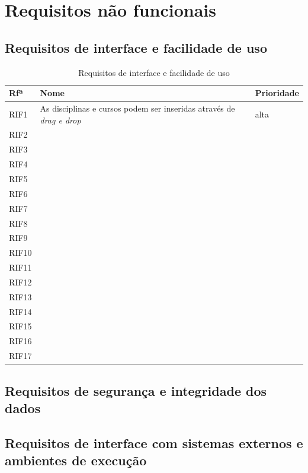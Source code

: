 \documentclass[11pt, twoside]{report}
\begin{document}
	
	\section{Requisitos não funcionais}
	\subsection{Requisitos de interface e facilidade de uso}
		\begin{table}[H]
		\centering
		\caption{Requisitos de interface e facilidade de uso}	
		\vspace{0.5cm}
		\begin{tabular}{|l|l|l|}
			\hline
			Rfª & Nome & Prioridade\\
			\hline
			RIF1 & As disciplinas e cursos podem ser inseridas através de \textit{drag e drop} &alta\\
			\hline
			RIF2 & &\\
			\hline
			RIF3 &&\\
			\hline
			RIF4 &&\\
			\hline
			RIF5 &&\\
			\hline
			RIF6&&\\
			\hline
			RIF7& & \\
			\hline
			RIF8& & \\
			\hline
			RIF9& &\\
			\hline
			RIF10&&\\
			\hline
			RIF11&&\\
			\hline
			RIF12& &\\
			\hline
			RIF13&&\\
			\hline
			RIF14&&\\
			\hline
			RIF15&&\\
			\hline
			RIF16&&\\
			\hline
			RIF17&&\\
			\hline
		\end{tabular}
		\label{requisitosdeinterface}
	\end{table}
	\subsection{Requisitos de segurança e integridade dos dados}
	\subsection{Requisitos de interface com sistemas externos e ambientes de execução}
	
\end{document}
